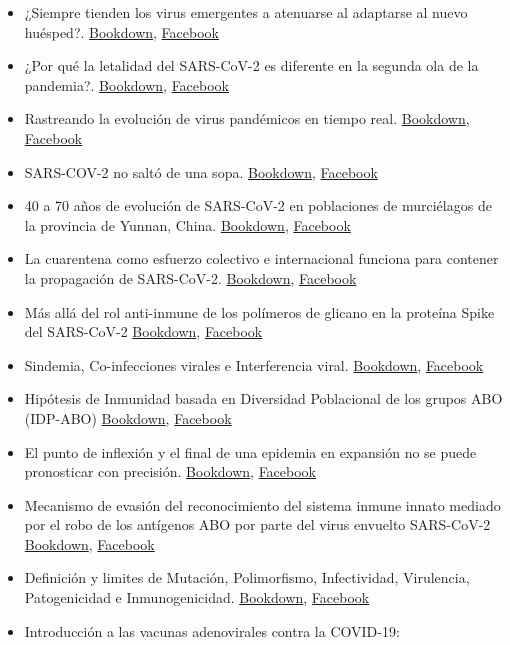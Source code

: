 \documentclass[
  12pt, krantz2,
  spanish,
]{krantz}
\begin{document}
\begin{itemize}
\item
  ¿Siempre tienden los virus emergentes a atenuarse al adaptarse al nuevo huésped?. \href{}{Bookdown}, \href{https://www.facebook.com/permalink.php?story_fbid=164436058614550\&id=107088044349352}{Facebook}
\item
  ¿Por qué la letalidad del SARS-CoV-2 es diferente en la segunda ola de la pandemia?. \href{}{Bookdown}, \href{https://www.facebook.com/permalink.php?story_fbid=167096031681886\&id=107088044349352}{Facebook}
\item
  Rastreando la evolución de virus pandémicos en tiempo real. \href{}{Bookdown}, \href{https://www.facebook.com/permalink.php?story_fbid=169322844792538\&id=107088044349352}{Facebook}
\item
  SARS-COV-2 no saltó de una sopa. \href{}{Bookdown}, \href{https://www.facebook.com/permalink.php?story_fbid=172899017768254\&id=107088044349352}{Facebook}
\item
  40 a 70 años de evolución de SARS-CoV-2 en poblaciones de murciélagos de la provincia de Yunnan, China. \href{}{Bookdown}, \href{https://www.facebook.com/permalink.php?story_fbid=173344151057074\&id=107088044349352}{Facebook}
\item
  La cuarentena como esfuerzo colectivo e internacional funciona para contener la propagación de SARS-CoV-2. \href{}{Bookdown}, \href{https://www.facebook.com/BioViral/videos/810087529531891}{Facebook}
\item
  Más allá del rol anti-inmune de los polímeros de glicano en la proteína Spike del SARS-CoV-2 \href{}{Bookdown}, \href{https://www.facebook.com/BioViral/videos/952346028621514/}{Facebook}
\item
  Sindemia, Co-infecciones virales e Interferencia viral. \href{}{Bookdown}, \href{https://www.facebook.com/permalink.php?story_fbid=185807143144108\&id=107088044349352}{Facebook}
\item
  Hipótesis de Inmunidad basada en Diversidad Poblacional de los grupos ABO (IDP-ABO) \href{}{Bookdown}, \href{https://www.facebook.com/permalink.php?story_fbid=188174372907385\&id=107088044349352}{Facebook}
\item
  El punto de inflexión y el final de una epidemia en expansión no se puede pronosticar con precisión. \href{}{Bookdown}, \href{https://www.facebook.com/permalink.php?story_fbid=191562869235202\&id=107088044349352}{Facebook}
\item
  Mecanismo de evasión del reconocimiento del sistema inmune innato mediado por el robo de los antígenos ABO por parte del virus envuelto SARS-CoV-2 \href{}{Bookdown}, \href{https://www.facebook.com/BioViral/videos/4039190299441114/}{Facebook}
\item
  Definición y limites de Mutación, Polimorfismo, Infectividad, Virulencia, Patogenicidad e Inmunogenicidad. \href{}{Bookdown}, \href{https://www.facebook.com/permalink.php?story_fbid=191978355860320\&id=107088044349352}{Facebook}
\item
  Introducción a las vacunas adenovirales contra la COVID-19:


\end{itemize}
\end{document}
